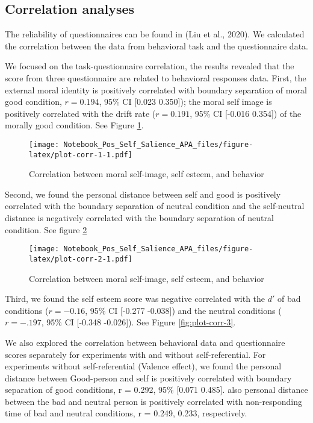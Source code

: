 \documentclass[
  english,
  man]{apa6}
\begin{document}
\hypertarget{correlation-analyses}{%
\subsection{Correlation analyses}\label{correlation-analyses}}

The reliability of questionnaires can be found in (Liu et al., 2020). We calculated the correlation between the data from behavioral task and the questionnaire data.

We focused on the task-questionnaire correlation, the results revealed that the score from three questionnaire are related to behavioral responses data.
First, the external moral identity is positively correlated with boundary separation of moral good condition, \(r = 0.194\), 95\% CI {[}0.023 0.350{]}); the moral self image is positively correlated with the drift rate (\(r = 0.191\), 95\% CI {[}-0.016 0.354{]}) of the morally good condition. See Figure \ref{fig:plot-corr-1}.

\begin{figure}
\centering
\texttt{[image: Notebook\_Pos\_Self\_Salience\_APA\_files/figure-latex/plot-corr-1-1.pdf]}
\caption{\label{fig:plot-corr-1}Correlation between moral self-image, self esteem, and behavior}
\end{figure}

Second, we found the personal distance between self and good is positively correlated with the boundary separation of neutral condition and the self-neutral distance is negatively correlated with the boundary separation of neutral condition. See figure \ref{fig:plot-corr-2}

\begin{figure}
\centering
\texttt{[image: Notebook\_Pos\_Self\_Salience\_APA\_files/figure-latex/plot-corr-2-1.pdf]}
\caption{\label{fig:plot-corr-2}Correlation between moral self-image, self esteem, and behavior}
\end{figure}

Third, we found the self esteem score was negative correlated with the \(d'\) of bad conditions (\(r = -0.16\), 95\% CI {[}-0.277 -0.038{]}) and the neutral conditions (\(r = -.197\), 95\% CI {[}-0.348 -0.026{]}). See Figure \ref{fig:plot-corr-3}.

We also explored the correlation between behavioral data and questionnaire scores separately for experiments with and without self-referential. For experiments without self-referential (Valence effect), we found the personal distance between Good-person and self is positively correlated with boundary separation of good conditions, r = 0.292, 95\% {[}0.071 0.485{]}. also personal distance between the bad and neutral person is positively correlated with non-responding time of bad and neutral conditions, r = 0.249, 0.233, respectively.
\end{document}
